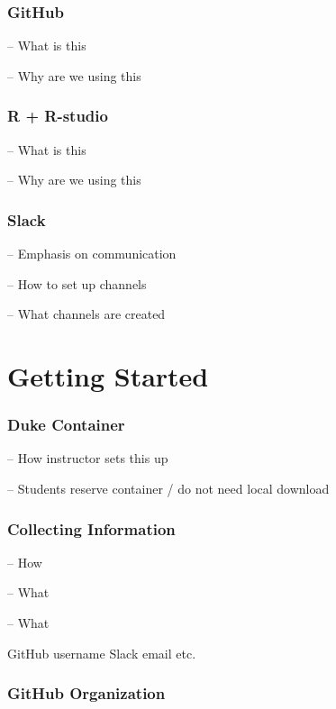 \documentclass[
  12pt]{article}
\begin{document}
\hypertarget{github}{%
\subsubsection{GitHub}\label{github}}

-- What is this

-- Why are we using this

\hypertarget{r-r-studio}{%
\subsubsection{R + R-studio}\label{r-r-studio}}

-- What is this

-- Why are we using this

\hypertarget{slack}{%
\subsubsection{Slack}\label{slack}}

-- Emphasis on communication

-- How to set up channels

-- What channels are created

\hypertarget{getting-started}{%
\section{Getting Started}\label{getting-started}}

\hypertarget{duke-container}{%
\subsubsection{Duke Container}\label{duke-container}}

-- How instructor sets this up

-- Students reserve container / do not need local download

\hypertarget{collecting-information}{%
\subsubsection{Collecting Information}\label{collecting-information}}

-- How

-- What

-- What

GitHub username Slack email etc.

\hypertarget{github-organization}{%
\subsubsection{GitHub Organization}\label{github-organization}}
\end{document}
